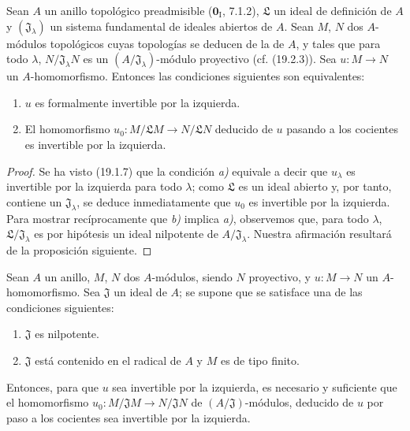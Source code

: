 \begin{proposition}[19.1.9]
\label{0.19.1.9-fr}
Sean $A$ un anillo topológico \textup{preadmisible ($\mathbf{0}_{\mathrm I}$,
7.1.2)}, $\mathfrak L$ un ideal de definición de $A$ y
$(\mathfrak J_\lambda)$ un sistema fundamental de ideales abiertos de $A$.
Sean $M$, $N$ dos $A$-módulos topológicos cuyas topologías se deducen
de la de $A$, y tales que para todo $\lambda$,
$N/\mathfrak J_\lambda N$ es un $(A/\mathfrak J_\lambda)$-módulo proyectivo
\textup{(cf. (19.2.3))}. Sea $u:M\to N$ un $A$-homomorfismo. Entonces las condiciones
siguientes son equivalentes:
\begin{enumerate}
  
\item[\textup{a)}] $u$ es formalmente invertible por la izquierda.

  

  \item[\textup{b)}] El homomorfismo
  $u_0:M/\mathfrak LM\to N/\mathfrak LN$ deducido de $u$ pasando a los
  cocientes es invertible por la izquierda.
\end{enumerate}
\end{proposition}

\begin{proof}
Se ha visto (19.1.7) que la condición \emph{a)} equivale a decir que $u_\lambda$ es
invertible por la izquierda para todo $\lambda$; como $\mathfrak L$ es un ideal
abierto y, por tanto, contiene un $\mathfrak J_\lambda$, se deduce inmediatamente que
$u_0$ es invertible por la izquierda. Para mostrar recíprocamente que \emph{b)} implica \emph{a)},
observemos que, para todo $\lambda$, $\mathfrak L/\mathfrak J_\lambda$ es por
hipótesis un ideal nilpotente de $A/\mathfrak J_\lambda$. Nuestra afirmación
resultará de la proposición siguiente.
\end{proof}

\begin{proposition}[19.1.10]
\label{0.19.1.10-fr}
Sean $A$ un anillo, $M$, $N$ dos $A$-módulos, siendo $N$ proyectivo, y
$u:M\to N$ un $A$-homomorfismo. Sea $\mathfrak J$ un ideal de $A$; se
supone que se satisface \textup{una} de las condiciones siguientes:
\begin{enumerate}
  \item[\textup{(i)}] $\mathfrak J$ es nilpotente.
  \item[\textup{(ii)}] $\mathfrak J$ está contenido en el radical de $A$ y $M$ es de
  tipo finito.
\end{enumerate}
Entonces, para que $u$ sea invertible por la izquierda, es necesario y suficiente que
el homomorfismo
$u_0:M/\mathfrak JM\to N/\mathfrak JN$ de $(A/\mathfrak J)$-módulos, deducido
de $u$ por paso a los cocientes sea invertible por la izquierda.
\end{proposition}

